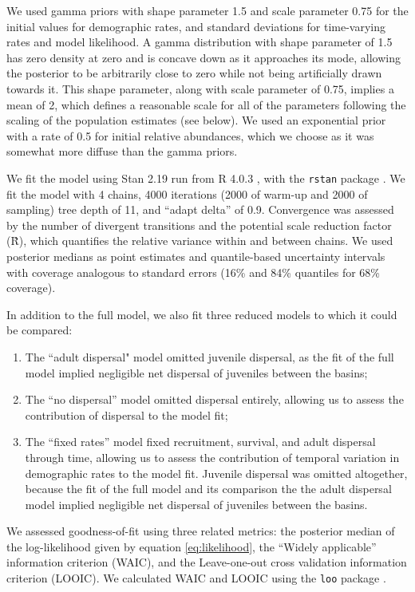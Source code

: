 \documentclass[11pt]{article}
\begin{document}
We used gamma priors with shape parameter 1.5 and scale parameter 0.75
for the initial values for demographic rates,
and standard deviations for time-varying rates and model likelihood.
A gamma distribution with shape parameter of 1.5 has zero density at zero 
and is concave down as it approaches its mode,
allowing the posterior to be arbitrarily close to zero 
while not being artificially drawn towards it.
This shape parameter, along with scale parameter of 0.75,
implies a mean of 2, 
which defines a reasonable scale for all of the parameters 
following the scaling of the population estimates (see below).
We used an exponential prior with a rate of 0.5 for initial relative abundances,
which we choose as it was somewhat more diffuse than the gamma priors.

We fit the model using Stan 2.19 \citep{carpenter2017}
run from R 4.0.3 \citep{r2020}, with the \texttt{rstan} package \citep{Stan2018}.
We fit the model with 4 chains,
4000 iterations (2000 of warm-up and 2000 of sampling)
tree depth of 11, and ``adapt delta'' of 0.9.
Convergence was assessed by the number of divergent transitions 
and the potential scale reduction factor (\^{R}),
which quantifies the relative variance within and between chains. 
We used posterior medians as point estimates
and quantile-based uncertainty intervals
with coverage analogous to standard errors
(16\% and 84\% quantiles for 68\% coverage).

In addition to the full model, 
we also fit three reduced models to which it could be compared:
%
\begin{enumerate}[label=(\arabic*)]
\item
The ``adult dispersal" model omitted juvenile dispersal,
as the fit of the full model implied negligible net dispersal of juveniles between the basins;
%
\item
The ``no dispersal'' model omitted dispersal entirely,
allowing us to assess the contribution of dispersal to the model fit; 
%
\item
The ``fixed rates'' model fixed recruitment, survival, and adult dispersal through time,
allowing us to assess the contribution of temporal variation in demographic rates
to the model fit. Juvenile dispersal was omitted altogether, 
because the fit of the full model and its comparison the the adult dispersal model 
implied negligible net dispersal of juveniles between the basins.
\end{enumerate}
%
We assessed goodness-of-fit using three related metrics:
the posterior median of the log-likelihood given by equation \ref{eq:likelihood},
the ``Widely applicable'' information criterion (WAIC),
and the Leave-one-out cross validation information criterion (LOOIC).
We calculated WAIC and LOOIC using the \texttt{loo} package \citep{vehtari2020}.
\end{document}

